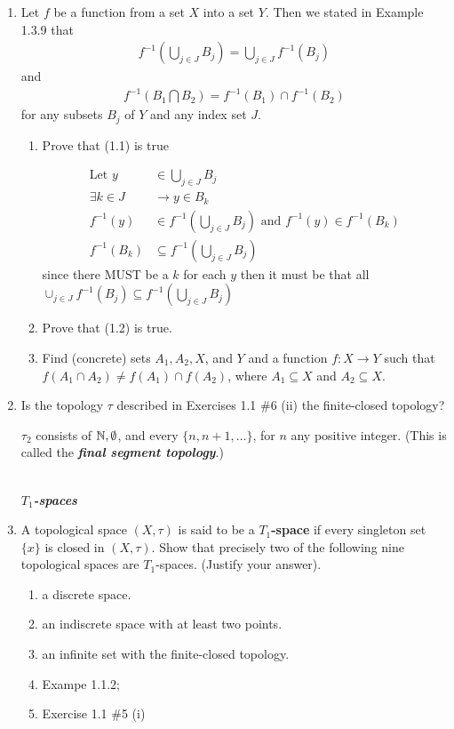 \documentclass[10pt,a4paper]{report}
\newcommand{\SPECIAL}[1]{\begin{center}
	{\Large \textbf{\textit{\\#1}} }
\end{center}
}
\begin{document}
\begin{enumerate}
	\item Let $f$ be a function from a set $X$ into a set $Y$.  Then we stated in Example 1.3.9 that
\begin{align}
	f^{-1}\left(\bigcup_{j\in J}B_j \right) = \bigcup_{j\in J}f^{-1}(B_j)
\end{align} and 
\begin{align}
	f^{-1}\left( B_1 \bigcap B_2\right) = f^{-1}(B_1)\cap f^{-1}(B_2)
\end{align} 
for any subsets $B_j$ of $Y$ and any index set $J$.
\begin{enumerate}
	\item Prove that (1.1) is true
	
	\begin{align*}
		\text{Let } y &\in \bigcup_{j \in J} B_j\\
		\exists k \in J &\to y \in B_k \\
		f^{-1}(y) &\in f^{-1}\left(\bigcup_{j\in J} B_j\right) \text{ and } f^{-1}(y) \in f^{-1}(B_k) \\
		f^{-1}(B_k) & \subseteq f^{-1}\left(\bigcup_{j\in J} B_j\right)
	\end{align*}since there MUST be a $k$ for each $y$ then it must be that all $\cup_{j\in J}f^{-1}(B_j) \subseteq f^{-1}\left(\bigcup_{j\in J} B_j\right)$
	
	\item Prove that (1.2) is true.
	\item Find (concrete) sets $A_1,A_2, X$, and $Y$ and a function $f: X \to Y$ such that $f(A_1\cap A_2)\ne f(A_1)\cap f(A_2)$, where $A_1 \subseteq X$ and $A_2 \subseteq X$.
\end{enumerate}

\item Is the topology $\tau$ described in Exercises 1.1 \#6 (ii) the finite-closed topology?

$\tau_2$ consists of $\mathbb{N},\emptyset$, and every $\{n, n+1, \dots\}$, for $n$ any positive integer. (This is called the \textbf{\textit{final segment topology}}.)

\SPECIAL{$T_1$-spaces}

\item A topological space $(X, \tau)$ is said to be a \textbf{$T_1$-space} if every singleton set $\{x\}$ is closed in $(X,\tau)$.  Show that precisely two of the following nine topological spaces are $T_1$-spaces. (Justify your answer).
\begin{enumerate}[label=(\roman*)]
	\item a discrete space.
	\item an indiscrete space with at least two points.
	\item an infinite set with the finite-closed topology.
	\item Exampe 1.1.2;
	\item Exercise 1.1 \#5 (i)
	

\end{enumerate}
\end{enumerate}
\end{document}
